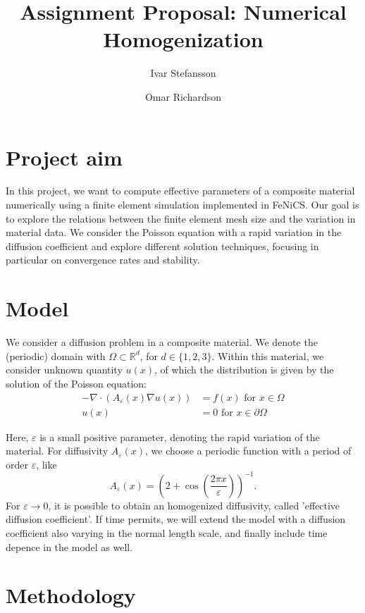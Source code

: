 \documentclass{article}
\title{Assignment Proposal: Numerical Homogenization}\author[1]{Ivar Stefansson}
\author[2]{Omar Richardson}
\affil[1]{Department of Mathematics and Computer Science, Karlstad University}
\affil[2]{Department of Mathematics, University of Bergen}
\renewcommand{\epsilon}{\varepsilon}
\newcommand{\R}{\mathbb{ R}}
\begin{document}
\maketitle

\section{Project aim}
\label{sec:project_aim}

In this project, we want to compute effective parameters of a composite material numerically using a finite element simulation implemented in FeNiCS.
Our goal is to explore the relations between the finite element mesh size and the variation in material data.
We consider the Poisson equation with a rapid variation in the diffusion coefficient and explore different solution techniques, focusing in particular on convergence rates and stability.

\section{Model}
\label{sec:model}
We consider a diffusion problem in a composite material. We denote the (periodic) domain with $\Omega \subset \R^d$, for $d\in\{1,2,3\}$. Within this material, we consider unknown quantity $u(x)$, of which the distribution is given by the solution of the Poisson equation:
\begin{equation}
    \begin{split}
        -\nabla \cdot (A_\epsilon(x)\nabla u(x)) &= f(x) \mbox{ for } x \in \Omega\\
        u(x) &= 0 \mbox{ for } x \in \partial\Omega
    \end{split}
    \label{eq:model}
\end{equation}

Here, $\epsilon$ is a small positive parameter, denoting the rapid variation of the material. 
For diffusivity $A_\epsilon(x)$, we choose a periodic function with a period of order $\epsilon$, like 
$$ A_\epsilon(x) = \left( 2+\cos(\frac{2\pi x}{\epsilon}) \right)^{-1}.$$
For $\epsilon \to 0$, it is possible to obtain an homogenized diffusivity, called 'effective diffusion coefficient'.
If time permits, we will extend the model with a diffusion coefficient also varying in the normal length scale, and finally include time depence in the model as well.

\section{Methodology}
\label{sec:methodology}
\end{document}
